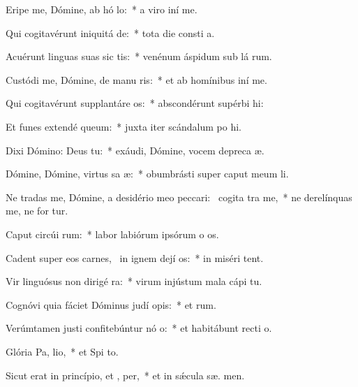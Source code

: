\item Eripe me, Dómine, ab hó lo:~* a viro iní  me.
\item Qui cogitavérunt iniquitá  de:~* tota die consti a.
\item Acuérunt linguas suas sic tis:~* venénum áspidum sub lá rum.
\item Custódi me, Dómine, de manu ris:~* et ab homínibus iní  me.
\item Qui cogitavérunt supplantáre  os:~* abscondérunt supérbi  hi:
\item Et funes extendé  queum:~* juxta iter scándalum po hi.
\item Dixi Dómino: Deus   tu:~* exáudi, Dómine, vocem depreca æ.
\item Dómine, Dómine, virtus sa æ:~* obumbrásti super caput meum   li.
\item Ne tradas me, Dómine, a desidério meo peccari:~\pscross{} cogita tra me,~* ne derelínquas me, ne for tur.
\item Caput circúi rum:~* labor labiórum ipsórum o os.
\item Cadent super eos carnes,~\pscross{} in ignem dejí os:~* in miséri  tent.
\item Vir linguósus non dirigé  ra:~* virum injústum mala cápi  tu.
\item Cognóvi quia fáciet Dóminus judí opis:~* et  rum.
\item Verúmtamen justi confitebúntur nó o:~* et habitábunt recti   o.
\item Glória Pa,  lio,~* et Spi to.
\item Sicut erat in princípio, et ,  per,~* et in sǽcula sæ. men.
